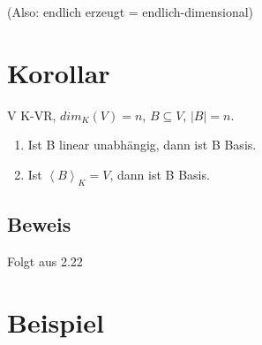 \documentclass[a4paper, openany]{book}
\begin{document}
    (Also: endlich erzeugt = endlich-dimensional)


    \section{Korollar}

    V K-VR, $dim_K(V) = n$, $B \subseteq V$, $|B| = n$.

    \begin{enumerate}[label=(\alph*)]
      \item Ist B linear unabhängig, dann ist B Basis.

      \item Ist $\left \langle B \right \rangle_K = V$, dann ist B Basis.
    \end{enumerate}

    \subsection{Beweis}

    Folgt aus 2.22

    \section{Beispiel}
\end{document}
